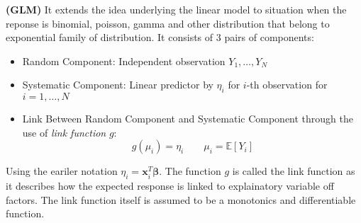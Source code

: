 \begin{definition}{\textbf{(GLM)}}
    It extends the idea underlying the linear model to situation when the reponse is binomial, poisson, gamma and other distribution that belong to exponential family of distribution. It consists of $3$ pairs of components:
    \begin{itemize}
        \item Random Component: Independent observation $Y_1,\dots,Y_N$
        \item Systematic Component: Linear predictor by $\eta_i$ for $i$-th observation for $i=1,\dots,N$
        \item Link Between Random Component and Systematic Component through the use of \emph{link function} $g$:
        \begin{equation*}
            g(\mu_i) = \eta_i \qquad \mu_i = \mathbb{E}[Y_i]
        \end{equation*}
    \end{itemize}
    Using the eariler notation $\eta_i = \boldsymbol x_i^T\boldsymbol \beta$. The function $g$ is called the link function as it describes how the expected response is linked to explainatory variable off factors. The link function itself is assumed to be a monotonics and differentiable function.
\end{definition}

